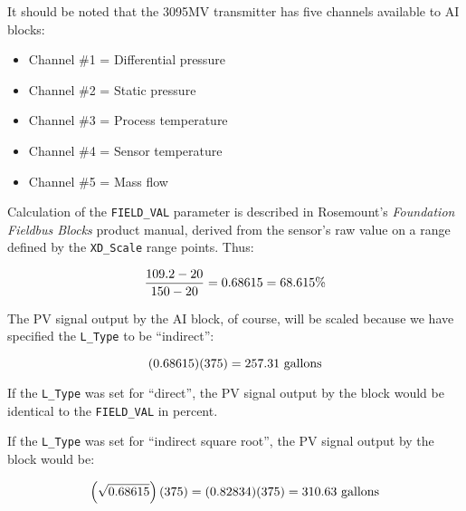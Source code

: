 





It should be noted that the 3095MV transmitter has five channels available to AI blocks:

\begin{itemize}
\item{} Channel \#1 = Differential pressure
\item{} Channel \#2 = Static pressure
\item{} Channel \#3 = Process temperature
\item{} Channel \#4 = Sensor temperature
\item{} Channel \#5 = Mass flow
\end{itemize}

\vskip 10pt

Calculation of the {\tt FIELD\_VAL} parameter is described in Rosemount's {\it Foundation Fieldbus Blocks} product manual, derived from the sensor's raw value on a range defined by the {\tt XD\_Scale} range points.  Thus:

$${{109.2 - 20} \over {150 - 20}} = 0.68615 = 68.615 \%$$

\vskip 10pt

The PV signal output by the AI block, of course, will be scaled because we have specified the {\tt L\_Type} to be ``indirect'':

$$(0.68615)(375) = 257.31 \hbox{ gallons}$$

\vskip 10pt

If the {\tt L\_Type} was set for ``direct'', the PV signal output by the block would be identical to the {\tt FIELD\_VAL} in percent.

\vskip 10pt

If the {\tt L\_Type} was set for ``indirect square root'', the PV signal output by the block would be:

$$\left(\sqrt{0.68615} \right) (375) = (0.82834)(375) = 310.63 \hbox{ gallons}$$



